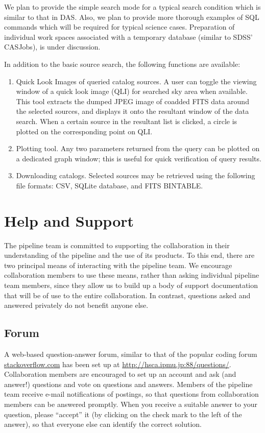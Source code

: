 \documentclass[12pt]{article}
\begin{document}
{We plan to provide the simple search mode for a typical
search condition which is similar to that in DAS.
Also, we plan to provide more thorough examples of SQL commands which will
be required for typical science cases.
Preparation of individual work spaces associated with a temporary
database (similar to SDSS' CASJobs), is under discussion.

In addition to the basic source search, the following functions are
available:
\begin{enumerate}
\item Quick Look Images of queried catalog sources. A user can toggle the
     viewing window of a quick look image (QLI) for searched sky area when
     available. This tool extracts the dumped JPEG image of
     coadded FITS data around the selected sources, and displays
     it onto the resultant window of the data search. When a certain
     source in the resultant list is clicked, a circle is plotted on
     the corresponding point on QLI.
\item Plotting tool. Any two parameters returned from the query can
     be plotted on a dedicated graph window; this is useful for quick
     verification of query results.
\item Downloading catalogs. Selected sources may be retrieved using the
     following file formats: CSV, SQLite database, and FITS BINTABLE.
\end{enumerate}


\section{Help and Support}
\label{sec:support}

The pipeline team is committed to supporting the collaboration in their understanding of the pipeline and the
use of its products.  To this end, there are two principal means of interacting with the pipeline team.  We
encourage collaboration members to use these means, rather than asking individual pipeline team members,
since they allow us to build up a body of support documentation that will be of use to the entire
collaboration.  In contrast, questions asked and answered privately do not benefit anyone else.

\subsection{Forum}

A web-based question-answer forum, similar to that of the popular coding forum \url{stackoverflow.com} has
been set up at \url{http://hsca.ipmu.jp:88/questions/}.  Collaboration members are encouraged to set up an
account and ask (and answer!) questions and vote on questions and answers.  Members of the pipeline team
receive e-mail notifications of postings, so that questions from collaboration members can be answered
promptly.  When you receive a suitable answer to your question, please ``accept'' it (by clicking on the check
mark to the left of the answer), so that everyone else can identify the correct solution.

}
\end{document}
